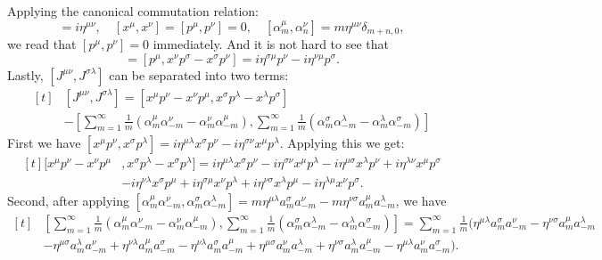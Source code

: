 \documentclass[12pt]{article}
\begin{document}
Applying the canonical commutation relation:
\begin{equation}
[x^\mu, p^\nu]=i\eta^{\mu\nu},\quad[x^\mu, x^\nu]=[p^\mu, p^\nu]=0,\quad[\alpha^\mu_m, \alpha^\nu_n]=m\eta^{\mu\nu}\delta_{m+n,0},
\end{equation}
we read that $[p^\mu, p^\nu]=0$ immediately. And it is not hard to see that
\begin{equation}
[p^\mu, J^{\nu\sigma}]=[p^\mu, x^\nu p^\sigma-x^\sigma p^\nu]=i\eta^{\sigma\mu}p^\nu-i\eta^{\nu\mu}p^\sigma.
\end{equation}
Lastly, $[J^{\mu\nu}, J^{\sigma\lambda}]$ can be separated into two terms:
\begin{equation}
\begin{aligned}[t]
&[J^{\mu\nu}, J^{\sigma\lambda}]=[x^\mu p^\nu-x^\nu p^\mu, x^\sigma p^\lambda-x^\lambda p^\sigma]\\
&-[\sum\limits_{m=1}^\infty\frac{1}{m}(\alpha_m^\mu \alpha_{-m}^\nu-\alpha_m^\nu \alpha_{-m}^\mu),\sum\limits_{m=1}^\infty\frac{1}{m}(\alpha_m^\sigma \alpha_{-m}^\lambda-\alpha_m^\lambda \alpha_{-m}^\sigma)]
\end{aligned}
\end{equation}
First we have $[x^\mu p^\nu,x^\sigma p^\lambda]=i\eta^{\mu\lambda}x^\sigma p^\nu-i\eta^{\sigma\nu}x^\mu p^\lambda$. Applying this we get:
\begin{equation} \label{commu1}
\begin{aligned}[t]
[x^\mu p^\nu-x^\nu p^\mu &, x^\sigma p^\lambda-x^\sigma p^\lambda]=i\eta^{\mu\lambda}x^\sigma p^\nu-i\eta^{\sigma\nu}x^\mu p^\lambda-i\eta^{\mu\sigma}x^\lambda p^\nu+i\eta^{\lambda\nu}x^\mu p^\sigma\\
&-i\eta^{\nu\lambda}x^\sigma p^\mu+i\eta^{\sigma\mu}x^\nu p^\lambda+i\eta^{\nu\sigma}x^\lambda p^\mu-i\eta^{\lambda\mu}x^\nu p^\sigma.
\end{aligned}
\end{equation}
Second, after applying $[\alpha_m^\mu \alpha_{-m}^\nu, \alpha_m^\sigma \alpha_{-m}^\lambda]=m\eta^{\mu\lambda}a_m^\sigma a_{-m}^\nu-m\eta^{\nu\sigma}a_m^\mu a_{-m}^\lambda$, we have
\begin{equation} \label{commu2}
\begin{aligned}[t]
&[\sum\limits_{m=1}^\infty\frac{1}{m}(\alpha_m^\mu \alpha_{-m}^\nu-\alpha_m^\nu \alpha_{-m}^\mu),\sum\limits_{m=1}^\infty\frac{1}{m}(\alpha_m^\sigma \alpha_{-m}^\lambda-\alpha_m^\lambda \alpha_{-m}^\sigma)]=\sum\limits_{m=1}^\infty\frac{1}{m}(\eta^{\mu\lambda}a_m^\sigma a_{-m}^\nu-\eta^{\nu\sigma}a_m^\mu a_{-m}^\lambda\\
&-\eta^{\mu\sigma}a_m^\lambda a_{-m}^\nu+\eta^{\nu\lambda}a_m^\mu a_{-m}^\sigma-\eta^{\nu\lambda}a_m^\sigma a_{-m}^\mu+\eta^{\mu\sigma}a_m^\nu a_{-m}^\lambda+\eta^{\nu\sigma}a_m^\lambda a_{-m}^\mu-\eta^{\mu\lambda}a_m^\nu a_{-m}^\sigma).
\end{aligned}
\end{equation}
\end{document}

